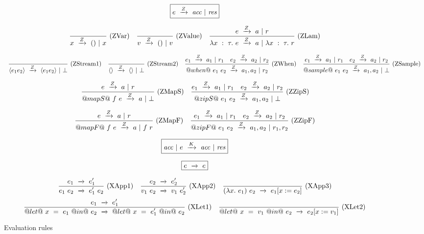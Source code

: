 
\begin{figure*}

$$
\boxed{\SourceStepZ{e}{\mi{acc}}{\mi{res}}}
$$

$$
\ruleAx
{
    \SourceStepZ{x}{()}{x}
}{ZVar}
\ruleAx
{
    \SourceStepZ{v}{()}{v}
}{ZValue}
\ruleIN
{
    \SourceStepZ{e}{a}{r}
}
{
    \SourceStepZ{\lambda{}x~:~\tau.~e}{a}{\lambda{}x~:~\tau.~r}
}{ZLam}
$$

$$
\ruleAx
{
    \SourceStepZ{\langle e_1 e_2 \rangle}{\langle e_1 e_2 \rangle}{\bot}
}{ZStream1}
\ruleAx
{
    \SourceStepZ{\langle \rangle}{\langle \rangle}{\bot}
}{ZStream2}
\ruleIN
{
    \SourceStepZ{e_1}{a_1}{r_1}
    \quad
    \SourceStepZ{e_2}{a_2}{r_2}
}
{
    \SourceStepZ{@when@~e_1~e_2}{a_1,a_2}{r_2}
}{ZWhen}
\ruleIN
{
    \SourceStepZ{e_1}{a_1}{r_1}
    \quad
    \SourceStepZ{e_2}{a_2}{r_2}
}
{
    \SourceStepZ{@sample@~e_1~e_2}{a_1,a_2}{\bot}
}{ZSample}
$$

$$
\ruleIN
{
    \SourceStepZ{e}{a}{r}
}
{
    \SourceStepZ{@mapS@~f~e}{a}{\bot}
}{ZMapS}
\ruleIN
{
    \SourceStepZ{e_1}{a_1}{r_1}
    \quad
    \SourceStepZ{e_2}{a_2}{r_2}
}
{
    \SourceStepZ{@zipS@~e_1~e_2}{a_1,a_2}{\bot}
}{ZZipS}
$$

$$
\ruleIN
{
    \SourceStepZ{e}{a}{r}
}
{
    \SourceStepZ{@mapF@~f~e}{a}{f~r}
}{ZMapF}
\ruleIN
{
    \SourceStepZ{e_1}{a_1}{r_1}
    \quad
    \SourceStepZ{e_2}{a_2}{r_2}
}
{
    \SourceStepZ{@zipF@~e_1~e_2}{a_1,a_2}{r_1,r_2}
}{ZZipF}
$$

$$
\boxed{\SourceStepK{\mi{acc}}{e}{\mi{acc}}{\mi{res}}}
$$

$$
\boxed{\SourceStepX{e}{e}}
$$

$$
\ruleIN
{
    \SourceStepX{e_1}{e_1'}
}
{
    \SourceStepX{e_1~e_2}{e_1'~e_2}
}{XApp1}
\ruleIN
{
    \SourceStepX{e_2}{e_2'}
}
{
    \SourceStepX{v_1~e_2}{v_1~e_2'}
}{XApp2}
\ruleAx
{
    \SourceStepX{(\lambda{}x.~e_1)~e_2}{e_1[x:=e_2]}
}{XApp3}
$$
$$
\ruleIN
{
    \SourceStepX{e_1}{e_1'}
}
{
    \SourceStepX{@let@~x~=~e_1~@in@~e_2}{@let@~x~=~e_1'~@in@~e_2}
}{XLet1}
\ruleAx
{
    \SourceStepX{@let@~x~=~v_1~@in@~e_2}{e_2[x:=v_1]}
}{XLet2}
$$

\caption{Evaluation rules}
\label{fig:source:eval}
\end{figure*}


